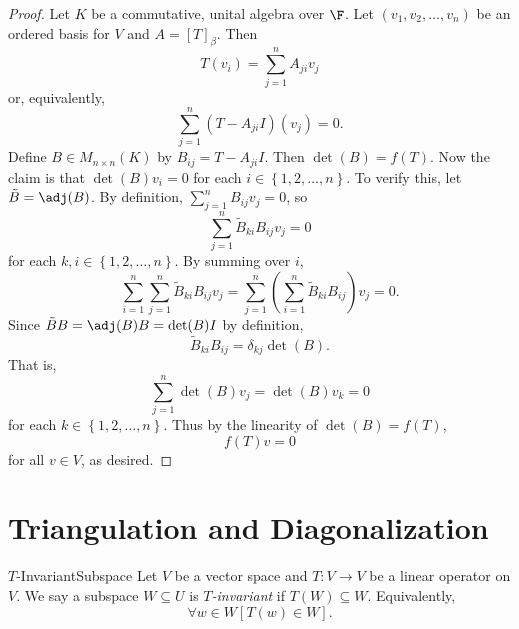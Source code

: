 \documentclass[math_245.tex]{subfiles}
\begin{document}
    \begin{proof}
        Let $K$ be a commutative, unital algebra over $\F$. Let $\left( v_1, v_2, \ldots, v_n \right)$ be an ordered basis for $V$ and $A = \left[ T \right]_\beta$. Then
        \begin{equation*}
            T(v_i) = \sum^{n}_{j=1} A_{ji}v_j
        \end{equation*} 
        or, equivalently,
        \begin{equation*}
            \sum^{n}_{j=1} \left( T - A_{ji}I \right) (v_j) = 0.
        \end{equation*}
        Define $B\in M_{n\times n}(K)$ by $B_{ij} = T - A_{ji}I$. Then $\det(B) = f(T)$. Now the claim is that $\det(B)v_i = 0$ for each $i\in \left\lbrace 1, 2, \ldots, n \right\rbrace$. To verify this, let $\tilde{B} = \adj(B)$. By definition, $\sum^{n}_{j=1} B_{ij}v_j = 0$, so
        \begin{equation*}
            \sum^{n}_{j=1} \tilde{B}_{ki} B_{ij} v_j = 0
        \end{equation*}
        for each $k, i\in \left\lbrace 1, 2, \ldots, n \right\rbrace$. By summing over $i$,
        \begin{equation*}
            \sum^{n}_{i=1} \sum^{n}_{j=1} \tilde{B}_{ki}B_{ij}v_j = \sum^{n}_{j=1} \left( \sum^{n}_{i=1} \tilde{B}_{ki} B_{ij} \right) v_j = 0. 
        \end{equation*}
        Since $\tilde{B}B = \adj(B)B = \det(B)I$ by definition,
        \begin{equation*}
            \tilde{B}_{ki}B_{ij} = \delta_{kj}\det(B).
        \end{equation*}
        That is,
        \begin{equation*}
            \sum^{n}_{j=1} \det(B)v_j = \det(B)v_k = 0
        \end{equation*}
        for each $k\in \left\lbrace 1, 2, \ldots, n \right\rbrace$. Thus by the linearity of $\det(B) = f(T)$,
        \begin{equation*}
            f(T)v = 0
        \end{equation*}
        for all $v\in V$, as desired.
    \end{proof}
    
    \section{Triangulation and Diagonalization}

    \begin{definition}{$T$-Invariant}{Subspace}
        Let $V$ be a vector space and $T:V\to V$ be a linear operator on $V$. We say a subspace $W\subseteq U$ is \emph{$T$-invariant} if $T(W)\subseteq W$. Equivalently,
        \begin{equation*}
            \forall w\in W \left[ T(w)\in W \right].
        \end{equation*}
    \end{definition}
\end{document}
